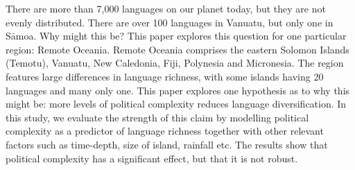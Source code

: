 There are more than 7,000 languages on our planet today, but they are not evenly distributed. There are over 100 languages in Vanuatu, but only one in S\={a}moa. Why might this be? This paper explores this question for one particular region: Remote Oceania. Remote Oceania comprises the eastern Solomon Islands (Temotu), Vanuatu, New Caledonia, Fiji, Polynesia and Micronesia. The region features large differences in language richness, with some islands having 20 languages and many only one. This paper explores one hypothesis as to why this might be: more levels of political complexity reduces language diversification. In this study, we evaluate the strength of this claim by modelling political complexity as a predictor of language richness together with other relevant factors such as time-depth, size of island, rainfall etc. The results show that political complexity has a significant effect, but that it is not robust. 
